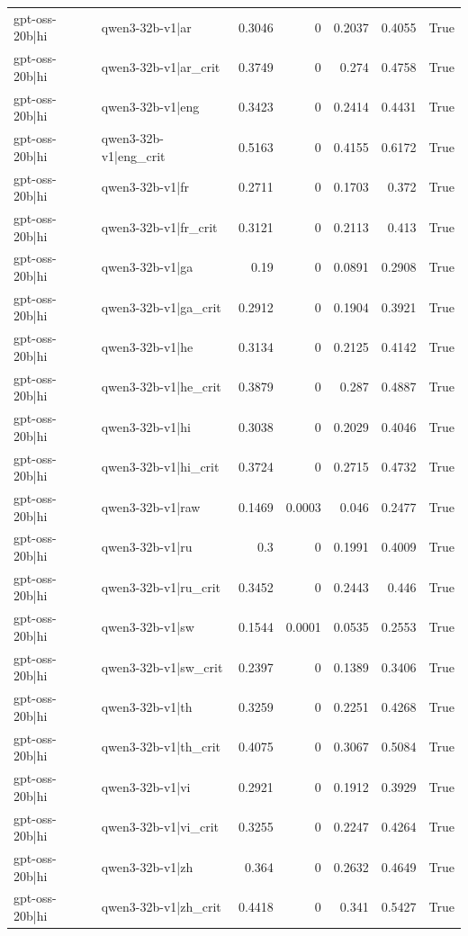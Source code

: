 \begin{table}
\begin{tabular}{l l r r r r l}
gpt-oss-20b|hi & qwen3-32b-v1|ar & 0.3046 & 0 & 0.2037 & 0.4055 & True \\
gpt-oss-20b|hi & qwen3-32b-v1|ar_crit & 0.3749 & 0 & 0.274 & 0.4758 & True \\
gpt-oss-20b|hi & qwen3-32b-v1|eng & 0.3423 & 0 & 0.2414 & 0.4431 & True \\
gpt-oss-20b|hi & qwen3-32b-v1|eng_crit & 0.5163 & 0 & 0.4155 & 0.6172 & True \\
gpt-oss-20b|hi & qwen3-32b-v1|fr & 0.2711 & 0 & 0.1703 & 0.372 & True \\
gpt-oss-20b|hi & qwen3-32b-v1|fr_crit & 0.3121 & 0 & 0.2113 & 0.413 & True \\
gpt-oss-20b|hi & qwen3-32b-v1|ga & 0.19 & 0 & 0.0891 & 0.2908 & True \\
gpt-oss-20b|hi & qwen3-32b-v1|ga_crit & 0.2912 & 0 & 0.1904 & 0.3921 & True \\
gpt-oss-20b|hi & qwen3-32b-v1|he & 0.3134 & 0 & 0.2125 & 0.4142 & True \\
gpt-oss-20b|hi & qwen3-32b-v1|he_crit & 0.3879 & 0 & 0.287 & 0.4887 & True \\
gpt-oss-20b|hi & qwen3-32b-v1|hi & 0.3038 & 0 & 0.2029 & 0.4046 & True \\
gpt-oss-20b|hi & qwen3-32b-v1|hi_crit & 0.3724 & 0 & 0.2715 & 0.4732 & True \\
gpt-oss-20b|hi & qwen3-32b-v1|raw & 0.1469 & 0.0003 & 0.046 & 0.2477 & True \\
gpt-oss-20b|hi & qwen3-32b-v1|ru & 0.3 & 0 & 0.1991 & 0.4009 & True \\
gpt-oss-20b|hi & qwen3-32b-v1|ru_crit & 0.3452 & 0 & 0.2443 & 0.446 & True \\
gpt-oss-20b|hi & qwen3-32b-v1|sw & 0.1544 & 0.0001 & 0.0535 & 0.2553 & True \\
gpt-oss-20b|hi & qwen3-32b-v1|sw_crit & 0.2397 & 0 & 0.1389 & 0.3406 & True \\
gpt-oss-20b|hi & qwen3-32b-v1|th & 0.3259 & 0 & 0.2251 & 0.4268 & True \\
gpt-oss-20b|hi & qwen3-32b-v1|th_crit & 0.4075 & 0 & 0.3067 & 0.5084 & True \\
gpt-oss-20b|hi & qwen3-32b-v1|vi & 0.2921 & 0 & 0.1912 & 0.3929 & True \\
gpt-oss-20b|hi & qwen3-32b-v1|vi_crit & 0.3255 & 0 & 0.2247 & 0.4264 & True \\
gpt-oss-20b|hi & qwen3-32b-v1|zh & 0.364 & 0 & 0.2632 & 0.4649 & True \\
gpt-oss-20b|hi & qwen3-32b-v1|zh_crit & 0.4418 & 0 & 0.341 & 0.5427 & True \\

\end{tabular}
\end{table}
